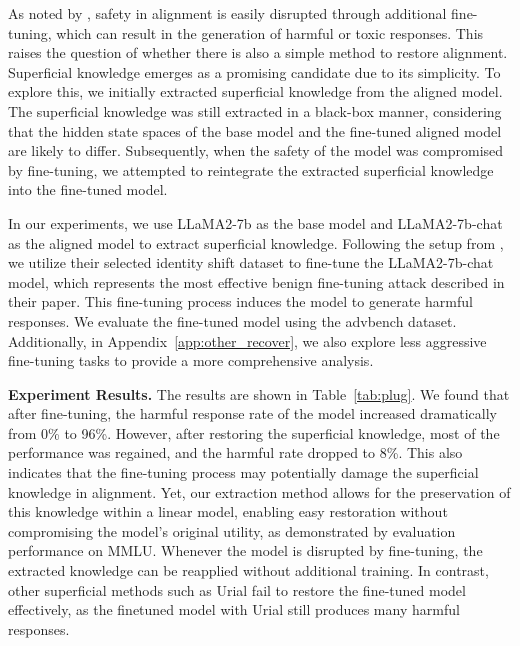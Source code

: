 As noted by \cite{alignattack}, safety in alignment is easily disrupted through additional fine-tuning, which can result in the generation of harmful or toxic responses. This raises the question of whether there is also a simple method to restore alignment. Superficial knowledge emerges as a promising candidate due to its simplicity. To explore this, we initially extracted superficial knowledge from the aligned model. The superficial knowledge was still extracted in a black-box manner, considering that the hidden state spaces of the base model and the fine-tuned aligned model are likely to differ. Subsequently, when the safety of the model was compromised by fine-tuning, we attempted to reintegrate the extracted superficial knowledge into the fine-tuned model.

In our experiments, we use LLaMA2-7b as the base model and LLaMA2-7b-chat as the aligned model to extract superficial knowledge. Following the setup from \cite{alignattack}, we utilize their selected identity shift dataset to fine-tune the LLaMA2-7b-chat model, which represents the most effective benign fine-tuning attack described in their paper. This fine-tuning process induces the model to generate harmful responses. We evaluate the fine-tuned model using the advbench dataset. Additionally, in Appendix~\ref{app:other_recover}, we also explore less aggressive fine-tuning tasks to provide a more comprehensive analysis.

\textbf{Experiment Results.} The results are shown in Table~\ref{tab:plug}. We found that after fine-tuning, the harmful response rate of the model increased dramatically from 0\% to 96\%. However, after restoring the superficial knowledge, most of the performance was regained, and the harmful rate dropped to 8\%. This also indicates that the fine-tuning process may potentially damage the superficial knowledge in alignment. Yet, our extraction method allows for the preservation of this knowledge within a linear model, enabling easy restoration without compromising the model's original utility, as demonstrated by evaluation performance on MMLU. 
Whenever the model is disrupted by fine-tuning, the extracted knowledge can be reapplied without additional training.
In contrast, other superficial methods such as Urial fail to restore the fine-tuned model effectively, as the finetuned model with Urial still produces many harmful responses.







